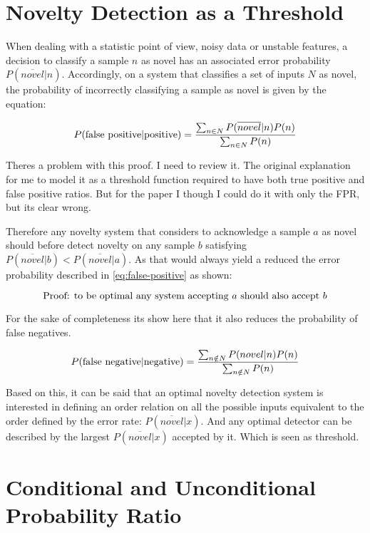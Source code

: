 \section{Novelty Detection as a Threshold}
When dealing with a statistic point of view, noisy data or unstable features,
a decision to classify a sample $n$ as novel has an associated error probability
$P(\overline{novel}|n)$.
Accordingly, on a system that classifies a set of inputs $N$ as novel, the
probability of incorrectly classifying a sample as novel is given by the
equation:

\begin{equation}
\label{eq:false-positive}
P(\textnormal{false positive}|\textnormal{positive}) = \frac{\sum_{n \in N}{P(\overline{novel}|n)P(n)}}{\sum_{n \in N}{P(n)}}
\end{equation}

Theres a problem with this proof. I need to review it. The original explanation
for me to model it as a threshold function required to have both true positive
and false positive ratios. But for the paper I though I could do it with only
the FPR, but its clear wrong.

Therefore any novelty system that considers to acknowledge a sample
$a$ as novel should before detect novelty on any sample $b$ satisfying
$P(\overline{novel}|b) < P(\overline{novel}|a)$.
As that would always yield a reduced the error probability described in
\autoref{eq:false-positive} as shown:

\begin{equation}
\textnormal{Proof: to be optimal any system accepting }a\textnormal{ should also accept }b
\end{equation}

For the sake of completeness its show here that it also reduces the probability
of false negatives.

\begin{equation}
P(\textnormal{false negative}|\textnormal{negative}) = \frac{\sum_{n \notin N}{P(novel|n)P(n)}}{\sum_{n \notin N}{P(n)}}
\end{equation}


Based on this, it can be said that an optimal novelty detection system is
interested in defining an order relation on all the possible inputs equivalent
to the order defined by the error rate: $P(\overline{novel}|x)$.
And any optimal detector can be described by the largest $P(\overline{novel}|x)$
accepted by it. Which is seen as threshold.


\section{Conditional and Unconditional Probability Ratio}

